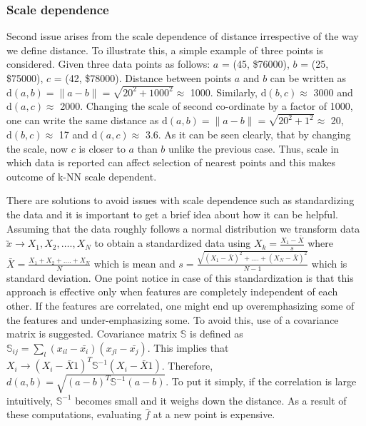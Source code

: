 \documentclass{article}
\begin{document}
\subsubsection{Scale dependence}
Second issue arises from the scale dependence of distance irrespective of the way we define distance. To illustrate this, a simple example of three points is considered. Given three data points as follows:
$a$ = (45, \$76000), $b$ = (25, \$75000), $c$ = (42, \$78000). Distance between points $a$ and $b$ can be written as $\mathrm{d}(a, b) = \|a - b\| = \sqrt{\mathrm{20^2} + \mathrm{1000^2}} \approx$ 1000. Similarly, $\mathrm{d}(b,c) \approx$ 3000 and $\mathrm{d}(a,c) \approx$ 2000. Changing the scale of second co-ordinate by a factor of 1000, one can write the same distance as $\mathrm{d}(a, b) = \|a - b\| = \sqrt{\mathrm{20}^2 + \mathrm{1}^2} \approx$ 20, $\mathrm{d}(b,c) \approx$ 17 and $\mathrm{d}(a, c) \approx$ 3.6. As it can be seen clearly, that by changing the scale, now $c$ is closer to $a$ than $b$ unlike the previous case. Thus, scale in which data is reported can affect selection of nearest points and this makes outcome of k-NN scale dependent. 

There are solutions to avoid issues with scale dependence such as standardizing the data and it is important to get a brief idea about how it can be helpful. Assuming that the data roughly follows a normal distribution we transform data $\utilde{x} \rightarrow X_1, X_2,\dots{.},X_N$ to obtain a standardized data using $X_k = \frac{X_1 - \bar{X}}{s}$ where $\bar{X} = \frac{X_1 + X_2 + \dots{.} + X_N}{N}$ which is mean and $s = \frac{\sqrt{(X_1 - \bar{X})^2 + \dots{.} + (X_N - \bar{X})^2}}{N-1}$ which is standard deviation. One point notice in case of this standardization is that this approach is effective only when features are completely independent of each other. If the features are correlated, one might end up overemphasizing some of the features and under-emphasizing some. To avoid this, use of a covariance matrix is suggested. Covariance matrix $\mathbb{S}$ is defined as $\mathbb{S}_{ij} = \sum_l(x_{il} - \bar{x_i})(x_{jl} - \bar{x_j})$. This implies that $X_i \rightarrow (X_i - \bar{X}1)^T\mathbb{S}^{-1} (X_i - \bar{X}1)$. Therefore, $d(a, b) = \sqrt{(a - b)^T \mathbb{S}^{-1}(a - b)}$. To put it simply, if the correlation is large intuitively, $\mathbb{S}^{-1}$ becomes small and it weighs down the distance. As a result of these computations, evaluating $\hat{f}$ at a new point is expensive.
\end{document}
